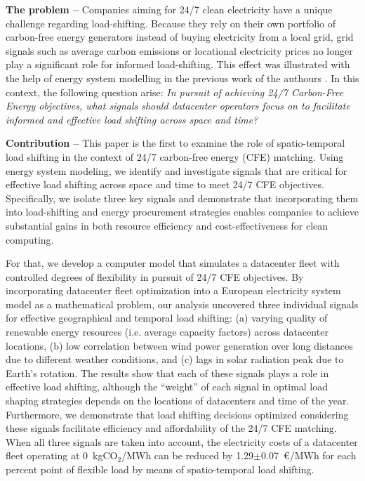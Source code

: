 \textbf{The problem --}
Companies aiming for 24/7 clean electricity have a unique challenge regarding load-shifting. Because they rely on their own portfolio of carbon-free energy generators instead of buying electricity from a local grid, grid signals such as average carbon emissions or locational electricity prices no longer play a significant role for informed load-shifting. This effect was illustrated with the help of energy system modelling in the previous work of the authours \cite{riepin-zenodo-systemlevel247,riepinMeansCostsSystemlevel2023}. In this context, the following question arise: \textit{In pursuit of achieving 24/7 Carbon-Free Energy objectives, what signals should datacenter operators focus on to facilitate informed and effective load shifting across space and time?}

\textbf{Contribution --} This paper is the first to examine the role of spatio-temporal load shifting in the context of 24/7 carbon-free energy (CFE) matching. Using energy system modeling, we identify and investigate signals that are critical for effective load shifting across space and time to meet 24/7 CFE objectives. Specifically, we isolate three key signals and demonstrate that incorporating them into load-shifting and energy procurement strategies enables companies to achieve substantial gains in both resource efficiency and cost-effectiveness for clean computing.

For that, we develop a computer model that simulates a datacenter fleet with controlled degrees of flexibility in pursuit of 24/7 CFE objectives.
By incorporating datacenter fleet optimization into a European electricity system model as a mathematical problem, our analysis uncovered three individual signals for effective geographical and temporal load shifting: (a) varying quality of renewable energy resources (i.e. average capacity factors) across datacenter locations, (b) low correlation between wind power generation over long distances due to different weather conditions, and (c) lags in solar radiation peak due to Earth's rotation.
The results show that each of these signals plays a role in effective load shifting, although the \enquote{weight} of each signal in optimal load shaping strategies depends on the locations of datacenters and time of the year.
Furthermore, we demonstrate that load shifting decisions optimized considering these signals facilitate efficiency and affordability of the 24/7 CFE matching. When all three signals are taken into account, the electricity costs of a datacenter fleet operating at 0~kgCO$_2$/MWh can be reduced by 1.29$\pm$0.07~\euro/MWh for each percent point of flexible load by means of spatio-temporal load shifting.

